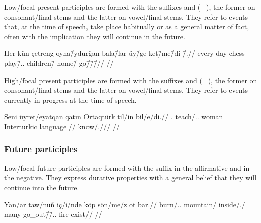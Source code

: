 Low\-/focal present participles are formed with the suffixes  and 
(\derivedfrom~ ), the former on consonant\-/final stems and the
latter on vowel\-/final stems.
They refer to events that, at the time of speech, take place habitually or as a
general matter of fact, often with the implication they will continue in the
future.

\ex
  \begingl
    \gla Her kün çetreng oyna\=/ydurğan bala\=/lar üy\=/ge ket\=/me\=/di%
    \=/\zero.//
    \glb every day chess play\=/\Ptcp.\Prs.\Lfoc{} children\=/\Pl{} home\=/\Dat
    {} go\=/\Neg\=/\Pst\=/\Tpl//
    \glft {}//
  \endgl
\xe

High\-/focal present participles are formed with the suffixes  and 
(\derivedfrom~ ), the former on consonant\-/final stems and the
latter on vowel\-/final stems.
They refer to events currently in progress at the time of speech.

\ex
  \begingl
    \gla Seni üyret\=/eyatqan qatın Ortaqtürk til\=/i\=n bil\=/e\=/di.//
    \glb \Ssg.\Acc{} teach\=/\Ptcp.\Prs.\Hfoc{} woman Interturkic language%
    \=/\Tsg\=/\Acc{} know\=/\Prs.\Lfoc\=/\Tsg//
    \glft {}//
  \endgl
\xe

\subsubsection{Future participles}

Low\-/focal future participles are formed with the suffix  in the affirmative and  in the
negative.
They express durative properties with a general belief that they will continue
into the future.

\ex
  \begingl
    \gla Yan\=/ar taw\=/nuñ iç\=/i\=/nde köp sön\=/me\=/z ot bar.//
    \glb burn\=/\Ptcp.\Fut.\Lfoc{} mountain\=/\Gen{} inside\=/\Poss.\Tsg\=/\Loc
    {} many go\_out\=/\Neg\=/\Ptcp.\Fut.\Lfoc{} fire exist//
    \glft {}//
  \endgl
\xe

